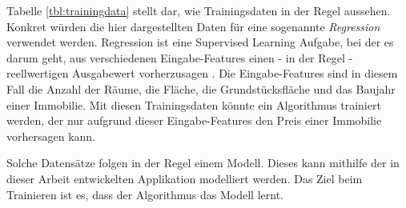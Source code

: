 Tabelle \ref{tbl:trainingdata} stellt dar, wie Trainingsdaten in der Regel aussehen. Konkret würden die hier dargestellten Daten für eine sogenannte \textit{Regression} verwendet werden. Regression ist eine Supervised Learning Aufgabe, bei der es darum geht, aus verschiedenen Eingabe-Features einen - in der Regel - reellwertigen Ausgabewert vorherzusagen \cite{Sarkar2018}. Die Eingabe-Features sind in diesem Fall die Anzahl der Räume, die Fläche, die Grundstücksfläche und das Baujahr einer Immobilie. Mit diesen Trainingsdaten könnte ein Algorithmus trainiert werden, der nur aufgrund dieser Eingabe-Features den Preis einer Immobilie vorhersagen kann.

Solche Datensätze folgen in der Regel einem Modell. Dieses kann mithilfe der in dieser Arbeit entwickelten Applikation modelliert werden. Das Ziel beim Trainieren ist es, dass der Algorithmus das Modell lernt.